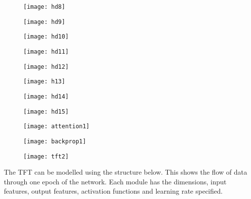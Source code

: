 \documentclass{article}
\begin{document}
\begin{figure}[ht]
    \centering
    \texttt{[image: hd8]}
    \caption{}
\end{figure}
\begin{figure}[ht]
    \centering
    \texttt{[image: hd9]}
    \caption{}
\end{figure}
\begin{figure}[ht]
    \centering
    \texttt{[image: hd10]}
    \caption{}
\end{figure}
\begin{figure}[ht]
    \centering
    \texttt{[image: hd11]}
    \caption{}
\end{figure}
\begin{figure}[ht]
    \centering
    \texttt{[image: hd12]}
    \caption{}
\end{figure}
\begin{figure}[ht]
    \centering
    \texttt{[image: h13]}
    \caption{}
\end{figure}
\begin{figure}[ht]
    \centering
    \texttt{[image: hd14]}
    \caption{}
\end{figure}
\begin{figure}[ht]
    \centering
    \texttt{[image: hd15]}
    \caption{}
\end{figure}
\begin{figure}[ht]
    \centering
    \texttt{[image: attention1]}
    \caption{}
\end{figure}
\begin{figure}[ht]
    \centering
    \texttt{[image: backprop1]}
    \caption{}
\end{figure}
\begin{figure}[ht]
    \centering
    \texttt{[image: tft2]}
    \caption{}
\end{figure}


\clearpage


The TFT can be modelled using the structure below. This shows the flow of data through one epoch of the network.  Each module has the dimensions, input features, output features, activation functions and learning rate specified.
\end{document}
